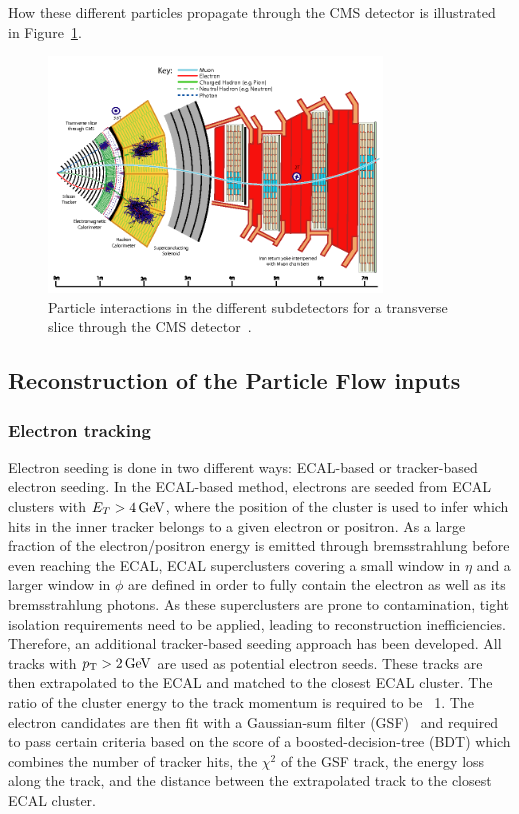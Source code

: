 How these different particles propagate through the CMS detector is illustrated in Figure~\ref{fig:objreco:PF}.
\begin{figure}[h!] 
    \centering
    \includegraphics[width=0.79\textwidth]{figures/event_reconstruction/PF.png}
    \caption{Particle interactions in the different subdetectors for a transverse slice through the CMS detector~\cite{1748-0221-12-10-P10003}.}
    \label{fig:objreco:PF}
\end{figure} 

\subsection{Reconstruction of the Particle Flow inputs}

\subsubsection{Electron tracking}
\label{subsub:objreco:electrontracking}
Electron seeding is done in two different ways: ECAL-based  or tracker-based electron seeding. In the ECAL-based method, electrons are seeded from  ECAL clusters with $E_T > 4 \,\text{Ge\hspace{-.08em}V}$, where the position of the cluster is used to infer which hits in the inner tracker belongs to a given electron or positron. As a large fraction of the electron/positron energy is emitted through bremsstrahlung before even reaching the ECAL, ECAL superclusters covering a small window in $\eta$ and a larger window in $\phi$ are defined in order to fully contain the electron as well as its bremsstrahlung photons. As these superclusters are prone to contamination, tight isolation requirements need to be applied, leading to reconstruction inefficiencies. Therefore, an additional tracker-based seeding approach has been developed. All tracks with $p_{\mathrm{T}}>2\,\text{Ge\hspace{-.08em}V}$ are used as potential electron seeds. These tracks are then extrapolated to the ECAL and matched to the closest ECAL cluster. The ratio of the cluster energy to the track
momentum is required to be ~1. The electron candidates are then fit with a Gaussian-sum filter (GSF)~\cite{0954-3899-31-9-N01} and required to pass certain criteria based on the score of a boosted-decision-tree (BDT) which combines the number of tracker hits, the $\chi^2$ of the GSF track, the energy loss along the  track, and the distance between the extrapolated track to the closest ECAL cluster.

